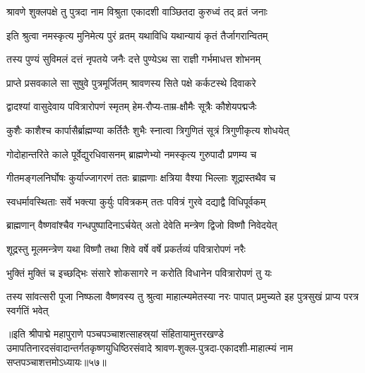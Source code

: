 
\twolineshloka
{श्रावणे शुक्लपक्षे तु पुत्रदा नाम विश्रुता}
{एकादशी वाञ्छितदा कुरुध्वं तद् व्रतं जनाः}%

\twolineshloka
{इति श्रुत्वा नमस्कृत्य मुनिमेत्य पुरं व्रतम्}
{यथाविधि यथान्यायं कृतं तैर्जागरान्वितम्}%

\twolineshloka
{तस्य पुण्यं सुविमलं दत्तं नृपतये जनैः}
{दत्ते पुण्येऽथ सा राज्ञी गर्भमाधत्त शोभनम्}%

\twolineshloka
{प्राप्ते प्रसवकाले सा सुषुवे पुत्रमूर्जितम्}
{श्रावणस्य सिते पक्षे कर्कटस्थे दिवाकरे}%

\twolineshloka
{द्वादश्यां वासुदेवाय पवित्रारोपणं स्मृतम्}
{हेम-रौप्य-ताम्र-क्षौमैः सूत्रैः कौशेयपद्मजैः}%

\twolineshloka
{कुशैः काशैश्च कार्पासैर्ब्राह्मण्या कर्तितैः शुभैः}
{स्नात्वा त्रिगुणितं सूत्रं त्रिगुणीकृत्य शोधयेत्}%

\twolineshloka
{गोदोहान्तरिते काले पूर्वेद्युरधिवासनम्}
{ब्राह्मणेभ्यो नमस्कृत्य गुरुपादौ प्रणम्य च}%

\twolineshloka
{गीतमङ्गलनिर्घोषः कुर्याज्जागरणं ततः}
{ब्राह्मणाः क्षत्रिया वैश्या भिल्लाः शूद्रास्तथैव च}%

\twolineshloka
{स्वधर्मावस्थिताः सर्वे भक्त्या कुर्युः पवित्रकम्}
{ततः पवित्रं गुरवे दद्याद्वै विधिपूर्वकम्}%

\twolineshloka
{ब्राह्मणान् वैष्णवांश्चैव गन्धपुष्पादिनाऽर्चयेत्}
{अतो देवेति मन्त्रेण द्विजो विष्णौ निवेदयेत्}%

\twolineshloka
{शूद्रस्तु मूलमन्त्रेण यथा विष्णौ तथा शिवे}
{वर्षे वर्षे प्रकर्तव्यं पवित्रारोपणं नरैः}%

\twolineshloka
{भुक्तिं मुक्तिं च इच्छद्भिः संसारे शोकसागरे}
{न करोति विधानेन पवित्रारोपणं तु यः}%

\threelineshloka
{तस्य सांवत्सरी पूजा निष्फला वैष्णवस्य तु}
{श्रुत्वा माहात्म्यमेतस्या नरः पापात् प्रमुच्यते}
{इह पुत्रसुखं प्राप्य परत्र स्वर्गतिं भवेत्}%

॥इति श्रीपाद्मे महापुराणे पञ्चपञ्चाशत्साहस्र्यां संहितायामुत्तरखण्डे उमापतिनारदसंवादान्तर्गतकृष्णयुधिष्ठिरसंवादे श्रावण-शुक्ल-पुत्रदा-एकादशी-माहात्म्यं नाम सप्तपञ्चाशत्तमोऽध्यायः॥५७॥

\genMangalaShloka

\hyperref[sec:ekadashi_mahatmyam_padma_puranam]{\closesub}
\clearpage

